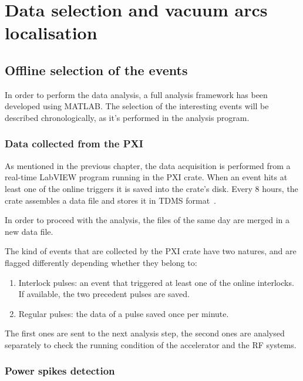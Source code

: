 \chapter[Data selection and vacuum arcs localisation]{Data selection and vacuum arcs localisation}

\section[Offline selection of the events]{Offline selection of the events}

In order to perform the data analysis, a full analysis framework has been developed using MATLAB. The selection of the interesting events will be described chronologically, as it's performed in the analysis program.

\subsection[Data collected from the PXI]{Data collected from the PXI}

As mentioned in the previous chapter, the data acquisition is performed from a real-time LabVIEW program running in the PXI crate. When an event hits at least one of the online triggers it is saved into the crate's disk. Every 8 hours, the crate assembles a data file and stores it in TDMS format~\cite{NI:TDMS}. 

In order to proceed with the analysis, the files of the same day are merged in a new data file.

The kind of events that are collected by the PXI crate have two natures, and are flagged differently depending whether they belong to:
\begin{enumerate}
\item Interlock pulses: an event that triggered at least one of the online interlocks. If available, the two precedent pulses are saved.
\item Regular pulses: the data of a pulse saved once per minute.
\end{enumerate}
The first ones are sent to the next analysis step, the second ones are analysed separately to check the running condition of the accelerator and the RF systems.


\newpage
\subsection[Power spikes detection]{Power spikes detection}


